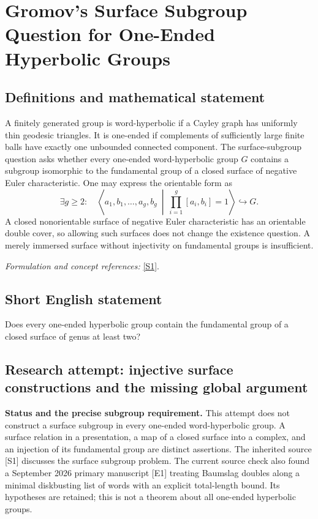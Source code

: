 \documentclass[11pt]{article}
\begin{document}
\section*{\texorpdfstring{Gromov's Surface Subgroup Question for One-Ended Hyperbolic Groups}{Gromov's Surface Subgroup Question for One-Ended Hyperbolic Groups}}\label{30006858}
\subsection{Definitions and mathematical statement}
A finitely generated group is word-hyperbolic if a Cayley graph has uniformly thin geodesic triangles. It is one-ended if complements of sufficiently large finite balls have exactly one unbounded connected component. The surface-subgroup question asks whether every one-ended word-hyperbolic group $G$ contains a subgroup isomorphic to the fundamental group of a closed surface of negative Euler characteristic. One may express the orientable form as
\[
 \exists g\ge2:\quad
 \left\langle a_1,b_1,\ldots,a_g,b_g\ \middle|\
 \prod_{i=1}^g[a_i,b_i]=1\right\rangle\hookrightarrow G.
\]
A closed nonorientable surface of negative Euler characteristic has an orientable double cover, so allowing such surfaces does not change the existence question. A merely immersed surface without injectivity on fundamental groups is insufficient.
\par\smallskip\textit{Formulation and concept references:} \href{https://research-repository.st-andrews.ac.uk/bitstream/handle/10023/26667/Gardam_2022_MRL_SGC_AAM.pdf?sequence=1}{[S1]}.

\subsection{Short English statement}
Does every one-ended hyperbolic group contain the fundamental group of a closed surface of genus at least two?
\subsection{Research attempt: injective surface constructions and the missing global argument}
\textbf{Status and the precise subgroup requirement.} This attempt does not construct a surface subgroup in every one-ended word-hyperbolic group. A surface relation in a presentation, a map of a closed surface into a complex, and an injection of its fundamental group are distinct assertions. The inherited source [S1] discusses the surface subgroup problem. The current source check also found a September 2026 primary manuscript [E1] treating Baumslag doubles along a minimal diskbusting list of words with an explicit total-length bound. Its hypotheses are retained; this is not a theorem about all one-ended hyperbolic groups.
\end{document}
